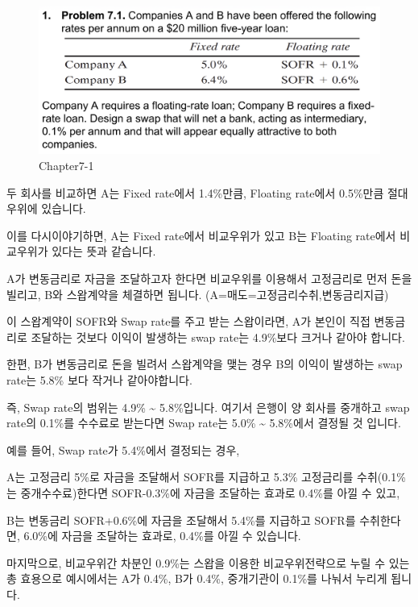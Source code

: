 \documentclass[
  letterpaper,
  DIV=11,
  numbers=noendperiod]{scrreprt}
\begin{document}
\begin{figure}[H]

{\centering \includegraphics{images/선물옵션_7-1.png}

}

\caption{Chapter7-1}

\end{figure}%

두 회사를 비교하면 A는 Fixed rate에서 1.4\%만큼, Floating rate에서
0.5\%만큼 절대우위에 있습니다.

이를 다시이야기하면, A는 Fixed rate에서 비교우위가 있고 B는 Floating
rate에서 비교우위가 있다는 뜻과 같습니다.

A가 변동금리로 자금을 조달하고자 한다면 비교우위를 이용해서 고정금리로
먼저 돈을 빌리고, B와 스왑계약을 체결하면 됩니다.
(A=매도=고정금리수취,변동금리지급)

이 스왑계약이 SOFR와 Swap rate를 주고 받는 스왑이라면, A가 본인이 직접
변동금리로 조달하는 것보다 이익이 발생하는 swap rate는 4.9\%보다 크거나
같아야 합니다.

한편, B가 변동금리로 돈을 빌려서 스왑계약을 맺는 경우 B의 이익이
발생하는 swap rate는 5.8\% 보다 작거나 같아야합니다.

즉, Swap rate의 범위는 4.9\% \textasciitilde{} 5.8\%입니다. 여기서
은행이 양 회사를 중개하고 swap rate의 0.1\%를 수수료로 받는다면 Swap
rate는 5.0\% \textasciitilde{} 5.8\%에서 결정될 것 입니다.

예를 들어, Swap rate가 5.4\%에서 결정되는 경우,

A는 고정금리 5\%로 자금을 조달해서 SOFR를 지급하고 5.3\% 고정금리를
수취(0.1\%는 중개수수료)한다면 SOFR-0.3\%에 자금을 조달하는 효과로
0.4\%를 아낄 수 있고,

B는 변동금리 SOFR+0.6\%에 자금을 조달해서 5.4\%를 지급하고 SOFR를
수취한다면, 6.0\%에 자금을 조달하는 효과로, 0.4\%를 아낄 수 있습니다.

마지막으로, 비교우위간 차분인 0.9\%는 스왑을 이용한 비교우위전략으로
누릴 수 있는 총 효용으로 예시에서는 A가 0.4\%, B가 0.4\%, 중개기관이
0.1\%를 나눠서 누리게 됩니다.
\end{document}
